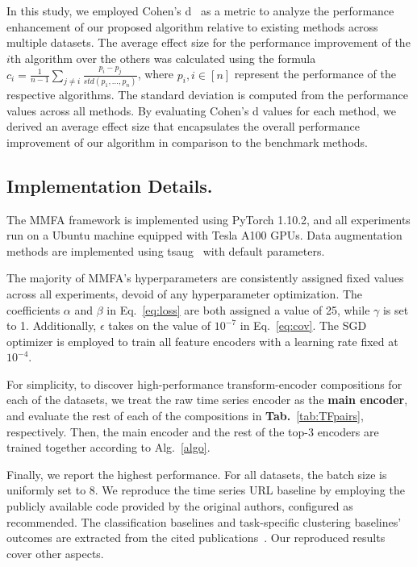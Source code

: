 \documentclass{article}
\begin{document}
In this study, we employed Cohen's d~\cite{becker2000effect} as a metric to analyze the performance enhancement of our proposed algorithm relative to existing methods across multiple datasets. The average effect size for the performance improvement of the $i$th algorithm over the others was calculated using the formula \( c_i = \frac 1 {n-1} \sum_{j\neq i}\frac{p_i - p_j}{ std(p_1, \ldots, p_n)} \), where \( p_i, i \in [n] \) represent the performance of the respective algorithms. The standard deviation is computed from the performance values across all methods. By evaluating Cohen's d values for each method, we derived an average effect size that encapsulates the overall performance improvement of our algorithm in comparison to the benchmark methods.

\subsection{Implementation Details.} The MMFA framework is implemented using PyTorch 1.10.2, and all experiments run on a Ubuntu machine equipped with Tesla A100 GPUs. Data augmentation methods are implemented using tsaug~\cite{tsaug} with default parameters.

The majority of MMFA's hyperparameters are consistently assigned fixed values across all experiments, devoid of any hyperparameter optimization. The coefficients $\alpha$ and $\beta$ in Eq.~\ref{eq:loss} are both assigned a value of 25, while $\gamma$ is set to 1. Additionally, $\epsilon$ takes on the value of $10^{-7}$ in Eq.~\ref{eq:cov}. The SGD optimizer is employed to train all feature encoders with a learning rate fixed at $10^{-4}$.

For simplicity, to discover high-performance transform-encoder compositions for each of the datasets, we treat the raw time series encoder as the \textbf{main encoder}, and evaluate the rest of each of the compositions in \textbf{Tab.}~\ref{tab:TFpairs}, respectively. Then, the main encoder and the rest of the top-3 encoders are trained together according to Alg.~\ref{algo}. 

Finally, we report the highest performance. For all datasets, the batch size is uniformly set to 8. We reproduce the time series URL baseline by employing the publicly available code provided by the original authors, configured as recommended. The classification baselines and task-specific clustering baselines' outcomes are extracted from the cited publications~\cite{bagnall2018uea, li2021shapenet, tang2020omni, xiao2022dynamic, yue2022ts2vec, zhang2022multiview}. Our reproduced results cover other aspects.
\end{document}
